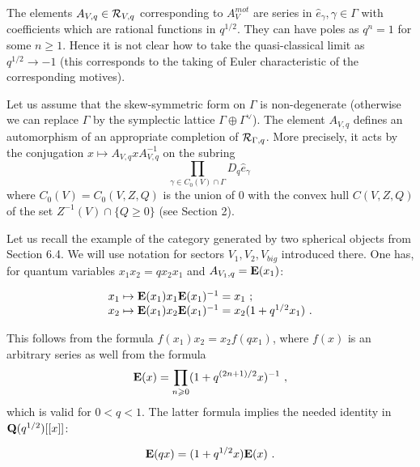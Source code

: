 \documentclass[12pt]{article}
\begin{document}
The elements $A_{V,q}\in {\cal R}_{V,q}$ corresponding to $A_V^{mot}$ are series in $\hat{e}_{\gamma},\gamma\in \Gamma$ with coefficients which are rational functions in $q^{1/2}$. They can have poles as $q^n=1$ for some $n\geqslant 1$. Hence it is not clear how to take the quasi-classical limit as $q^{1/2}\to -1$ (this corresponds to the taking of Euler characteristic of the corresponding motives).

Let us assume that the skew-symmetric form on $\Gamma$ is non-degenerate (otherwise we can replace $\Gamma$ by the symplectic lattice $\Gamma\oplus \Gamma^{\vee}$). The element $A_{V,q}$ defines an automorphism of an appropriate completion of
${\cal R}_{\Gamma,q}$. More precisely, it acts by the conjugation $x\mapsto A_{V,q}xA_{V,q}^{-1}$ on the subring
$$\prod_{\gamma\in C_0(V)\cap \Gamma}D_q\hat{e}_{\gamma}\,$$ where $C_0(V)=C_0(V,Z,Q)$ is the union of $0$ with the  
convex hull $C(V,Z,Q)$ of the set $Z^{-1}(V)\cap \{Q\geqslant 0\}$ (see Section 2).

Let us recall the  example of the category generated by two spherical objects from Section 6.4. We will use notation for sectors $V_1,V_2,V_{big}$ introduced there.
One has, for 
quantum variables $x_1 x_2= q x_2 x_1$ and $A_{V_1,q}={\bf E}(x_1)$:

$$\begin{array}{l}
x_1\mapsto {\bf E}(x_1)x_1{\bf E}(x_1)^{-1}=x_1\,\,;\\
x_2\mapsto {\bf E}(x_1)x_2{\bf E}(x_1)^{-1}=x_2(1+q^{1/2}x_1)\,\,.
\end{array}$$

This follows from the formula $f(x_1)x_2=x_2f(qx_1)$, where $f(x)$ is an arbitrary series as well from the formula
$${\bf E}(x)=\prod_{n\geqslant 0}(1+q^{(2n+1)/2}x)^{-1}\,\,,$$
which is valid for $0<q<1$. The latter formula implies the needed identity in ${\bf Q}(q^{1/2})[[x]]$:

$${\bf E}(qx)=(1+q^{1/2}x){\bf E}(x)\,\,.$$
\end{document}

